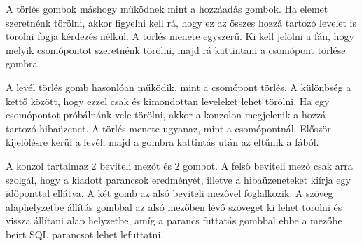 
A törlés gombok máshogy működnek mint a hozzáadás gombok. Ha elemet szeretnénk törölni, akkor figyelni kell rá, hogy ez az összes hozzá tartozó levelet is törölni fogja kérdezés nélkül. A törlés menete egyszerű. Ki kell jelölni a fán, hogy melyik csomópontot szeretnénk törölni, majd rá kattintani a csomópont törlése gombra.


A levél törlés gomb hasonlóan működik, mint a csomópont törlés. A különbség a kettő között, hogy ezzel csak és kimondottan leveleket lehet törölni. Ha egy csomópontot próbálnánk vele törölni, akkor a konzolon megjelenik a hozzá tartozó hibaüzenet. A törlés menete ugyanaz, mint a csomópontnál. Először kijelölésre kerül a levél, majd a gombra kattintás után az eltűnik a fából.


A konzol tartalmaz 2 beviteli mezőt és 2 gombot. A felső beviteli mező csak arra szolgál, hogy a kiadott parancsok eredményét, illetve a hibaüzeneteket kiírja egy időponttal ellátva. A két gomb az alsó beviteli mezővel foglalkozik. A szöveg alaphelyzetbe állítás gombbal az alsó mezőben lévő szöveget ki lehet törölni és vissza állítani alap helyzetbe, amíg a parancs futtatás gombbal ebbe a mezőbe beírt SQL parancsot lehet lefuttatni.


